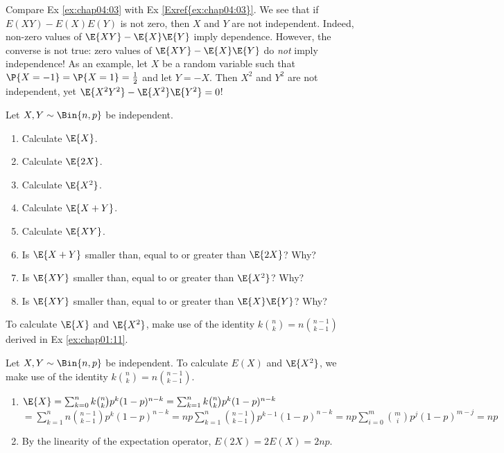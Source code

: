 \begin{remark}
	Compare Ex \ref{ex:chap04:03} with Ex \ref{Exref{ex:chap04:03}}. We see that if $E(XY) - E(X)E(Y)$ is not zero, then $X$ and $Y$ are not independent. Indeed, non-zero values of $\E{XY} - \E{X}\E{Y}$ imply dependence. However, the converse is not true: zero values of $\E{XY} - \E{X}\E{Y}$ do \emph{not} imply independence! As an example, let $X$ be a random variable such that $\P{X = -1} = \P{X = 1} = \frac{1}{2}$ and let $Y = -X$. Then $X^2$ and $Y^2$ are not independent, yet $\E{X^2Y^2} -\E{X^2} \E{Y^2} = 0$!    
\end{remark}

\begin{exercise}\label{ex:chap04:01}
	Let $X, Y \sim \Bin{n,p}$ be independent.
	\begin{enumerate}
		\item Calculate $\E{X}$.
		\item Calculate $\E{2X}$.
		\item Calculate $\E{X^2}$.
		\item Calculate $\E{X+Y}$. 
		\item Calculate $\E{XY}$.
		\item Is $\E{X+Y}$ smaller than, equal to or greater than $\E{2X}$? Why?
		\item Is $\E{XY}$ smaller than, equal to or greater than $\E{X^2}$? Why?
		\item Is $\E{XY}$ smaller than, equal to or greater than $\E{X}\E{Y}$? Why?
	\end{enumerate}
	\begin{hint}
		To calculate $\E{X}$ and $\E{X^2}$, make use of the identity $k \binom{n}{k} = n \binom{n - 1}{k - 1}$ derived in Ex \ref{ex:chap01:11}.
	\end{hint}
	\begin{solution}
	Let $X, Y \sim \Bin{n,p}$ be independent. To calculate $E(X)$ and $\E{X^2}$, we make use of the identity $k \binom{n}{k} = n \binom{n - 1}{k - 1}$.
	\begin{enumerate}
		\item $\E{X} = \sum_{k = 0}^n k \binom{n}{k} p^k (1 - p)^{n - k} = \sum_{k = 1}^n k \binom{n}{k} p^k (1 - p)^{n - k} $\\$= \sum_{k = 1}^n n \binom{n - 1}{k - 1} p^k (1 - p)^{n - k} = np \sum_{k = 1}^n \binom{n - 1}{k - 1} p^{k - 1} (1 - p)^{n - k} = np \sum_{i = 0}^m \binom{m}{i} p^j (1 - p)^{m - j} = np$
		\item By the linearity of the expectation operator, $E(2X) = 2E(X) = 2np$.

\end{enumerate}
\end{solution}
\end{exercise}
